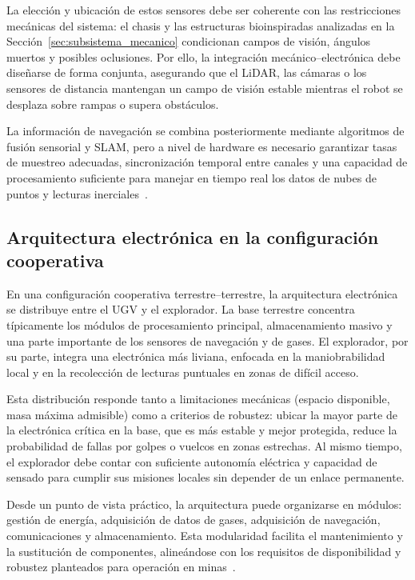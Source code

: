 La elección y ubicación de estos sensores debe ser coherente con las restricciones mecánicas del sistema: el chasis y las estructuras bioinspiradas analizadas en la Sección~\ref{sec:subsistema_mecanico} condicionan campos de visión, ángulos muertos y posibles oclusiones. Por ello, la integración mecánico--electrónica debe diseñarse de forma conjunta, asegurando que el LiDAR, las cámaras o los sensores de distancia mantengan un campo de visión estable mientras el robot se desplaza sobre rampas o supera obstáculos.

La información de navegación se combina posteriormente mediante algoritmos de fusión sensorial y SLAM, pero a nivel de hardware es necesario garantizar tasas de muestreo adecuadas, sincronización temporal entre canales y una capacidad de procesamiento suficiente para manejar en tiempo real los datos de nubes de puntos y lecturas inerciales~\cite{KimChoi_2025_MineMapping}.

\subsection{Arquitectura electrónica en la configuración cooperativa}

\hspace{1.25cm}
En una configuración cooperativa terrestre--terrestre, la arquitectura electrónica se distribuye entre el UGV y el explorador. La base terrestre concentra típicamente los módulos de procesamiento principal, almacenamiento masivo y una parte importante de los sensores de navegación y de gases. El explorador, por su parte, integra una electrónica más liviana, enfocada en la maniobrabilidad local y en la recolección de lecturas puntuales en zonas de difícil acceso.

Esta distribución responde tanto a limitaciones mecánicas (espacio disponible, masa máxima admisible) como a criterios de robustez: ubicar la mayor parte de la electrónica crítica en la base, que es más estable y mejor protegida, reduce la probabilidad de fallas por golpes o vuelcos en zonas estrechas. Al mismo tiempo, el explorador debe contar con suficiente autonomía eléctrica y capacidad de sensado para cumplir sus misiones locales sin depender de un enlace permanente.

Desde un punto de vista práctico, la arquitectura puede organizarse en módulos: gestión de energía, adquisición de datos de gases, adquisición de navegación, comunicaciones y almacenamiento. Esta modularidad facilita el mantenimiento y la sustitución de componentes, alineándose con los requisitos de disponibilidad y robustez planteados para operación en minas~\cite{AdvancesMining_2023}.

